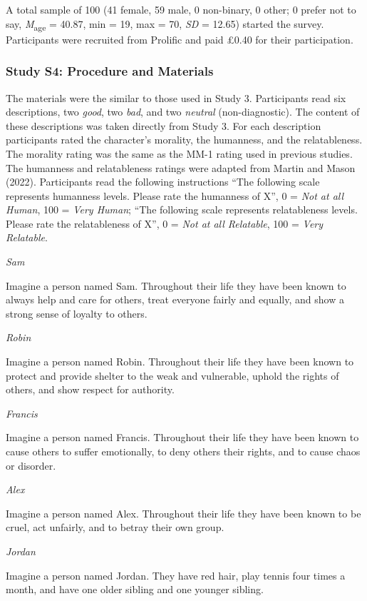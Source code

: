 \documentclass[
  man,floatsintext]{apa6}
\begin{document}
A total sample of 100 (41 female, 59 male, 0 non-binary, 0 other; 0 prefer not to say, \emph{M}\textsubscript{age} = 40.87, min = 19, max = 70, \emph{SD} = 12.65) started the survey. Participants were recruited from Prolific and paid £0.40 for their participation.

\subsubsection{Study S4: Procedure and Materials}\label{study-s4-procedure-and-materials}

The materials were the similar to those used in Study 3. Participants read six descriptions, two \emph{good}, two \emph{bad}, and two \emph{neutral} (non-diagnostic). The content of these descriptions was taken directly from Study 3. For each description participants rated the character's morality, the humanness, and the relatableness. The morality rating was the same as the MM-1 rating used in previous studies. The humanness and relatableness ratings were adapted from Martin and Mason (2022). Participants read the following instructions ``The following scale represents humanness levels. Please rate the humanness of X'', 0 = \emph{Not at all Human}, 100 = \emph{Very Human}; ``The following scale represents relatableness levels. Please rate the relatableness of X'', 0 = \emph{Not at all Relatable}, 100 = \emph{Very Relatable}.

\emph{Sam}

Imagine a person named Sam.
Throughout their life they have been known to always help and care for others, treat everyone fairly and equally, and show a strong sense of loyalty to others.

\emph{Robin}

Imagine a person named Robin.
Throughout their life they have been known to protect and provide shelter to the weak and vulnerable, uphold the rights of others, and show respect for authority.

\emph{Francis}

Imagine a person named Francis.
Throughout their life they have been known to cause others to suffer emotionally, to deny others their rights, and to cause chaos or disorder.

\emph{Alex}

Imagine a person named Alex.
Throughout their life they have been known to be cruel, act unfairly, and to betray their own group.

\emph{Jordan}

Imagine a person named Jordan.
They have red hair, play tennis four times a month, and have one older sibling and one younger sibling.
\end{document}
